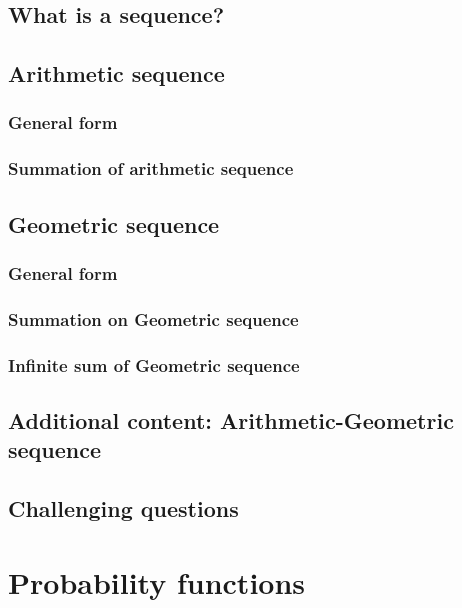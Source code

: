 \documentclass[12pt]{article}
\begin{document}
    \subsection{What is a sequence?}

    \subsection{Arithmetic sequence}

    \subsubsection*{General form}

    \subsubsection*{Summation of arithmetic sequence}

    \subsection{Geometric sequence}

    \subsubsection*{General form}

    \subsubsection*{Summation on Geometric sequence}

    \subsubsection*{Infinite sum of Geometric sequence}

    \subsection{Additional content: Arithmetic-Geometric sequence}

    \subsection{Challenging questions}

    \newpage

    \section{Probability functions}
\end{document}
